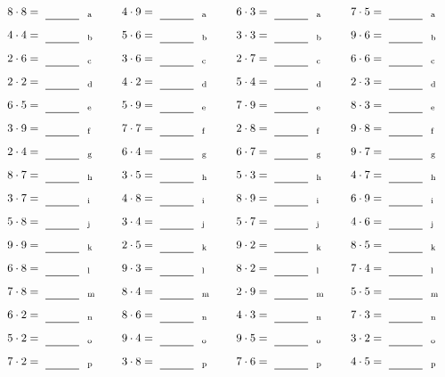\documentclass
[
  draft    = true,
  fontsize = 11pt,
  parskip  = half-
]
{scrartcl}
\begin{document}
\par\vfill\par
\begin{align*}
    \pline{8\cdot8}&=\rline{a}
  & \pline{4\cdot9}&=\rline{a}
  & \pline{6\cdot3}&=\rline{a}
  & \pline{7\cdot5}&=\rline{a} \\[1ex]
    \pline{4\cdot4}&=\rline{b}
  & \pline{5\cdot6}&=\rline{b}
  & \pline{3\cdot3}&=\rline{b}
  & \pline{9\cdot6}&=\rline{b} \\[1ex]
    \pline{2\cdot6}&=\rline{c}
  & \pline{3\cdot6}&=\rline{c}
  & \pline{2\cdot7}&=\rline{c}
  & \pline{6\cdot6}&=\rline{c} \\[1ex]
    \pline{2\cdot2}&=\rline{d}
  & \pline{4\cdot2}&=\rline{d}
  & \pline{5\cdot4}&=\rline{d}
  & \pline{2\cdot3}&=\rline{d} \\[1ex]
    \pline{6\cdot5}&=\rline{e}
  & \pline{5\cdot9}&=\rline{e}
  & \pline{7\cdot9}&=\rline{e}
  & \pline{8\cdot3}&=\rline{e} \\[1ex]
    \pline{3\cdot9}&=\rline{f}
  & \pline{7\cdot7}&=\rline{f}
  & \pline{2\cdot8}&=\rline{f}
  & \pline{9\cdot8}&=\rline{f} \\[1ex]
    \pline{2\cdot4}&=\rline{g}
  & \pline{6\cdot4}&=\rline{g}
  & \pline{6\cdot7}&=\rline{g}
  & \pline{9\cdot7}&=\rline{g} \\[1ex]
    \pline{8\cdot7}&=\rline{h}
  & \pline{3\cdot5}&=\rline{h}
  & \pline{5\cdot3}&=\rline{h}
  & \pline{4\cdot7}&=\rline{h} \\[1ex]
    \pline{3\cdot7}&=\rline{i}
  & \pline{4\cdot8}&=\rline{i}
  & \pline{8\cdot9}&=\rline{i}
  & \pline{6\cdot9}&=\rline{i} \\[1ex]
    \pline{5\cdot8}&=\rline{j}
  & \pline{3\cdot4}&=\rline{j}
  & \pline{5\cdot7}&=\rline{j}
  & \pline{4\cdot6}&=\rline{j} \\[1ex]
    \pline{9\cdot9}&=\rline{k}
  & \pline{2\cdot5}&=\rline{k}
  & \pline{9\cdot2}&=\rline{k}
  & \pline{8\cdot5}&=\rline{k} \\[1ex]
    \pline{6\cdot8}&=\rline{l}
  & \pline{9\cdot3}&=\rline{l}
  & \pline{8\cdot2}&=\rline{l}
  & \pline{7\cdot4}&=\rline{l} \\[1ex]
    \pline{7\cdot8}&=\rline{m}
  & \pline{8\cdot4}&=\rline{m}
  & \pline{2\cdot9}&=\rline{m}
  & \pline{5\cdot5}&=\rline{m} \\[1ex]
    \pline{6\cdot2}&=\rline{n}
  & \pline{8\cdot6}&=\rline{n}
  & \pline{4\cdot3}&=\rline{n}
  & \pline{7\cdot3}&=\rline{n} \\[1ex]
    \pline{5\cdot2}&=\rline{o}
  & \pline{9\cdot4}&=\rline{o}
  & \pline{9\cdot5}&=\rline{o}
  & \pline{3\cdot2}&=\rline{o} \\[1ex]
    \pline{7\cdot2}&=\rline{p}
  & \pline{3\cdot8}&=\rline{p}
  & \pline{7\cdot6}&=\rline{p}
  & \pline{4\cdot5}&=\rline{p}
\end{align*}
\end{document}
